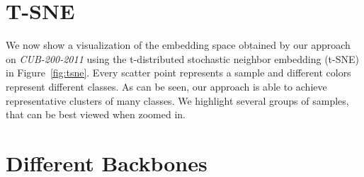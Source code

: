\documentclass{article}
\begin{document}
\section{T-SNE}
\label{sec:tsne}
We now show a visualization of the embedding space obtained by our approach on \textit{CUB-200-2011} using the t-distributed stochastic neighbor embedding (t-SNE) \cite{DBLP:journals/ml/MaatenH12} in Figure~\ref{fig:tsne}. Every scatter point represents a sample and different colors represent different classes. As can be seen, our approach is able to achieve representative clusters of many classes. We highlight several groups of samples, that can be best viewed when zoomed in. 



\iffalse
\section{Different Backbones}
\label{sec:backbone}
\begin{table}[hbt!]
\centering
{}
\caption{Performance of our approach using DenseNet201 as backbone architecture on CUB-200-2011 and Cars196 compared to ResNet50.}
\label{tab:backbone}
\end{table}
\end{document}
